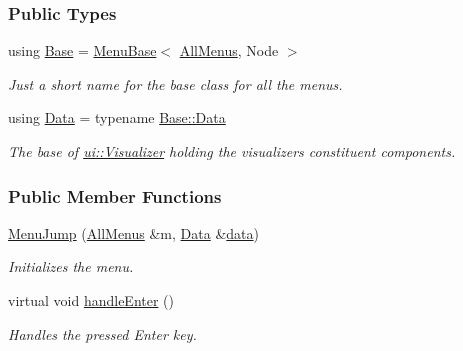 \subsubsection*{Public Types}
\begin{DoxyCompactItemize}
\item 
using \hyperlink{structslb_1_1core_1_1ui_1_1MenuJump_a5f93d2b9e807147a4ecdbf3ff4ee4780}{Base} = \hyperlink{structslb_1_1core_1_1ui_1_1MenuBase}{Menu\+Base}$<$ \hyperlink{structslb_1_1core_1_1ui_1_1AllMenus}{All\+Menus}, Node $>$\hypertarget{structslb_1_1core_1_1ui_1_1MenuJump_a5f93d2b9e807147a4ecdbf3ff4ee4780}{}\label{structslb_1_1core_1_1ui_1_1MenuJump_a5f93d2b9e807147a4ecdbf3ff4ee4780}

\begin{DoxyCompactList}\small\item\em Just a short name for the base class for all the menus. \end{DoxyCompactList}\item 
using \hyperlink{structslb_1_1core_1_1ui_1_1MenuJump_aca2151fa379129e9d0344dcaebbbe248}{Data} = typename \hyperlink{structslb_1_1core_1_1ui_1_1MenuBase_a1803444111552d2e5b87671292dd74cb}{Base\+::\+Data}\hypertarget{structslb_1_1core_1_1ui_1_1MenuJump_aca2151fa379129e9d0344dcaebbbe248}{}\label{structslb_1_1core_1_1ui_1_1MenuJump_aca2151fa379129e9d0344dcaebbbe248}

\begin{DoxyCompactList}\small\item\em The base of \hyperlink{structslb_1_1core_1_1ui_1_1Visualizer}{ui\+::\+Visualizer} holding the visualizer\textquotesingle{}s constituent components. \end{DoxyCompactList}\end{DoxyCompactItemize}
\subsubsection*{Public Member Functions}
\begin{DoxyCompactItemize}
\item 
\hyperlink{structslb_1_1core_1_1ui_1_1MenuJump_a66e58e4cd90be76e9aad5d1d2e8f7f53}{Menu\+Jump} (\hyperlink{structslb_1_1core_1_1ui_1_1AllMenus}{All\+Menus} \&m, \hyperlink{structslb_1_1core_1_1ui_1_1MenuBase_a1803444111552d2e5b87671292dd74cb}{Data} \&\hyperlink{structslb_1_1core_1_1ui_1_1MenuBase_a475d9457affb2b4fc96737e269d6911f}{data})
\begin{DoxyCompactList}\small\item\em Initializes the menu. \end{DoxyCompactList}\item 
virtual void \hyperlink{structslb_1_1core_1_1ui_1_1MenuJump_a43132ae328b3c299a87e398e0b945da3}{handle\+Enter} ()\hypertarget{structslb_1_1core_1_1ui_1_1MenuJump_a43132ae328b3c299a87e398e0b945da3}{}\label{structslb_1_1core_1_1ui_1_1MenuJump_a43132ae328b3c299a87e398e0b945da3}

\begin{DoxyCompactList}\small\item\em Handles the pressed Enter key. \end{DoxyCompactList}\end{DoxyCompactItemize}
